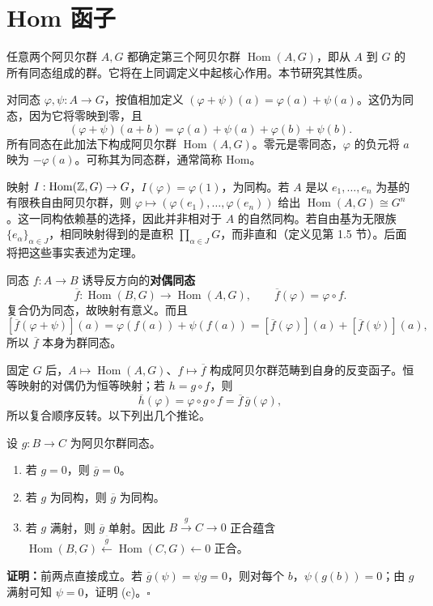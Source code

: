 \section{Hom 函子}
任意两个阿贝尔群 $A,G$ 都确定第三个阿贝尔群 $\operatorname{Hom}(A,G)$，即从 $A$ 到 $G$ 的所有同态组成的群。它将在上同调定义中起核心作用。本节研究其性质。

对同态 $\varphi,\psi:A\to G$，按值相加定义 $(\varphi+\psi)(a)=\varphi(a)+\psi(a)$。这仍为同态，因为它将零映到零，且
\[
(\varphi+\psi)(a+b)=\varphi(a)+\psi(a)+\varphi(b)+\psi(b).
\]
所有同态在此加法下构成阿贝尔群 $\operatorname{Hom}(A,G)$。零元是零同态，$\varphi$ 的负元将 $a$ 映为 $-\varphi(a)$。可称其为同态群，通常简称 Hom。

映射 $I:\operatorname{Hom}(\mathbb{Z},G)\to G$，$I(\varphi)=\varphi(1)$，为同构。若 $A$ 是以 $e_1,\ldots,e_n$ 为基的有限秩自由阿贝尔群，则 $\varphi\mapsto(\varphi(e_1),\ldots,\varphi(e_n))$ 给出 $\operatorname{Hom}(A,G)\cong G^n$。这一同构依赖基的选择，因此并非相对于 $A$ 的自然同构。若自由基为无限族 $\{e_\alpha\}_{\alpha\in J}$，相同映射得到的是直积 $\prod_{\alpha\in J}G$，而非直和（定义见第 1.5 节）。后面将把这些事实表述为定理。

同态 $f:A\to B$ 诱导反方向的\textbf{对偶同态}
\[
\overline f:\operatorname{Hom}(B,G)\to\operatorname{Hom}(A,G),\qquad
\overline f(\varphi)=\varphi\circ f.
\]
复合仍为同态，故映射有意义。而且
\[
[\overline f(\varphi+\psi)](a)=\varphi(f(a))+\psi(f(a))
=[\overline f(\varphi)](a)+[\overline f(\psi)](a),
\]
所以 $\overline f$ 本身为群同态。

固定 $G$ 后，$A\mapsto\operatorname{Hom}(A,G)$、$f\mapsto\overline f$ 构成阿贝尔群范畴到自身的反变函子。恒等映射的对偶仍为恒等映射；若 $h=g\circ f$，则
\[
\overline h(\varphi)=\varphi\circ g\circ f=\overline f\,\overline g(\varphi),
\]
所以复合顺序反转。以下列出几个推论。

设 $g:B\to C$ 为阿贝尔群同态。
\begin{enumerate}[label=(\alph*)]
\item 若 $g=0$，则 $\overline g=0$。
\item 若 $g$ 为同构，则 $\overline g$ 为同构。
\item 若 $g$ 满射，则 $\overline g$ 单射。因此 $B\xrightarrow{g}C\to0$ 正合蕴含 $\operatorname{Hom}(B,G)\xleftarrow{\overline g}\operatorname{Hom}(C,G)\leftarrow0$ 正合。
\end{enumerate}
\textbf{证明：}前两点直接成立。若 $\overline g(\psi)=\psi g=0$，则对每个 $b$，$\psi(g(b))=0$；由 $g$ 满射可知 $\psi=0$，证明 (c)。\hfill$\square$

